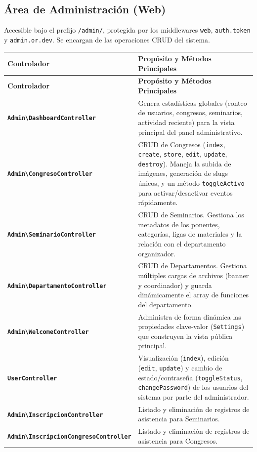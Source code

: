 \documentclass{article}
\begin{document}
\subsection{Área de Administración (Web)}

Accesible bajo el prefijo \texttt{/admin/}, protegida por los middlewares \texttt{web}, \texttt{auth.token} y \texttt{admin.or.dev}. Se encargan de las operaciones CRUD del sistema.

\begin{longtable}{>{\raggedright\arraybackslash}p{5cm} >{\raggedright\arraybackslash}p{10cm}}
\toprule
\textbf{Controlador} & \textbf{Propósito y Métodos Principales} \\
\midrule
\endfirsthead
\toprule
\textbf{Controlador} & \textbf{Propósito y Métodos Principales} \\
\midrule
\endhead
\bottomrule
\endfoot
\bottomrule
\endlastfoot
\textbf{\texttt{Admin\textbackslash DashboardController}} & Genera estadísticas globales (conteo de usuarios, congresos, seminarios, actividad reciente) para la vista principal del panel administrativo. \\
\textbf{\texttt{Admin\textbackslash CongresoController}} & CRUD de Congresos (\texttt{index}, \texttt{create}, \texttt{store}, \texttt{edit}, \texttt{update}, \texttt{destroy}). Maneja la subida de imágenes, generación de slugs únicos, y un método \texttt{toggleActivo} para activar/desactivar eventos rápidamente. \\
\textbf{\texttt{Admin\textbackslash SeminarioController}} & CRUD de Seminarios. Gestiona los metadatos de los ponentes, categorías, ligas de materiales y la relación con el departamento organizador. \\
\textbf{\texttt{Admin\textbackslash DepartamentoController}} & CRUD de Departamentos. Gestiona múltiples cargas de archivos (banner y coordinador) y guarda dinámicamente el array de funciones del departamento. \\
\textbf{\texttt{Admin\textbackslash WelcomeController}} & Administra de forma dinámica las propiedades clave-valor (\texttt{Settings}) que construyen la vista pública principal. \\
\textbf{\texttt{UserController}} & Visualización (\texttt{index}), edición (\texttt{edit}, \texttt{update}) y cambio de estado/contraseña (\texttt{toggleStatus}, \texttt{changePassword}) de los usuarios del sistema por parte del administrador. \\
\textbf{\texttt{Admin\textbackslash InscripcionController}} & Listado y eliminación de registros de asistencia para Seminarios. \\
\textbf{\texttt{Admin\textbackslash InscripcionCongresoController}} & Listado y eliminación de registros de asistencia para Congresos. \\
\end{longtable}
\end{document}
